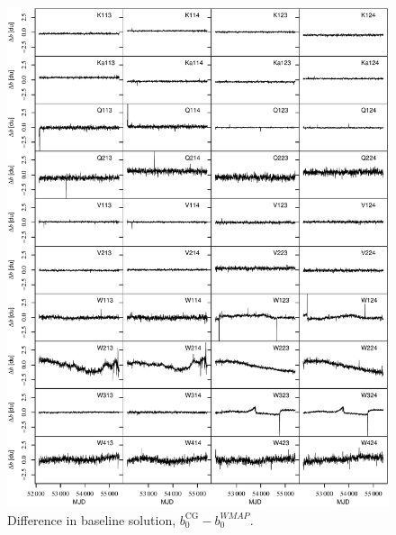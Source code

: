 \documentclass[twocolumn]{../../common/aa}
\begin{document}
\begin{figure}[p]
	\centering
	\includegraphics[width=\textwidth]{figures/instpar_CG_dbaseline_v1.pdf}
	\caption{Difference in baseline solution, $b_0^\mathrm{CG}-b_0^\mathit{WMAP}$.}
	\label{fig:baseline}
\end{figure}
\end{document}
